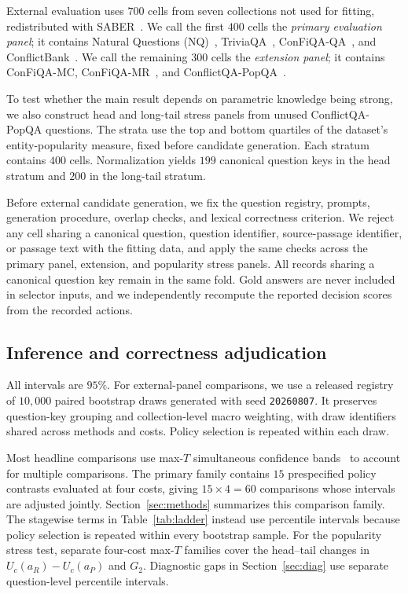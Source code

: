 \documentclass[sigconf]{acmart}
\newcommand{\ar}{a_R}
\newcommand{\ap}{a_P}
\begin{document}
External evaluation uses $700$ cells from seven collections not used
for fitting, redistributed with SABER~\cite{zhu2026saber}.
We call the first $400$ cells the \emph{primary evaluation panel}; it
contains Natural Questions (NQ)~\cite{kwiatkowski2019nq},
TriviaQA~\cite{joshi2017triviaqa}, ConFiQA-QA~\cite{bi2025contextdpo},
and ConflictBank~\cite{su2024conflictbank}. We call the remaining
$300$ cells the \emph{extension panel}; it contains ConFiQA-MC,
ConFiQA-MR~\cite{bi2025contextdpo}, and
ConflictQA-PopQA~\cite{xie2024adaptive}.

To test whether the main result depends on parametric knowledge being
strong, we also construct head and long-tail stress panels from unused
ConflictQA-PopQA questions. The strata use the top and bottom quartiles
of the dataset's entity-popularity measure, fixed before candidate
generation. Each stratum contains $400$ cells. Normalization yields
$199$ canonical question keys in the head stratum and $200$ in the
long-tail stratum.

Before external candidate generation, we fix the question registry,
prompts, generation procedure, overlap checks, and lexical correctness
criterion. We reject any cell sharing a canonical question, question
identifier, source-passage identifier, or passage text with the fitting
data, and apply the same checks across the primary panel, extension,
and popularity stress panels. All records sharing a canonical question
key remain in the same fold. Gold answers are never included in
selector inputs, and we independently recompute the reported decision
scores from the recorded actions.

\subsection{Inference and correctness adjudication}
\label{sec:inference}

All intervals are $95\%$. For external-panel comparisons, we use a
released registry of $10{,}000$ paired bootstrap draws generated with
seed \texttt{20260807}. It preserves question-key grouping and
collection-level macro weighting, with draw identifiers shared across
methods and costs. Policy selection is repeated within each draw.

Most headline comparisons use max-$T$ simultaneous confidence
bands~\cite{westfall1993resampling} to account for multiple comparisons.
The primary family contains $15$ prespecified policy contrasts evaluated
at four costs, giving $15\times4=60$ comparisons whose intervals are
adjusted jointly. Section~\ref{sec:methods} summarizes this comparison
family. The stagewise terms in Table~\ref{tab:ladder} instead use
percentile intervals because policy selection is repeated within every
bootstrap sample. For the popularity stress test, separate four-cost
max-$T$ families cover the head--tail changes in
$U_c(\ar)-U_c(\ap)$ and $G_2$. Diagnostic gaps in
Section~\ref{sec:diag} use separate question-level percentile intervals.
\end{document}
